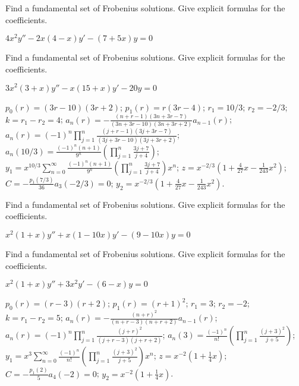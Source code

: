 \documentclass{ximera}
\begin{document}
\begin{problem}\label{exer:7.7.15}
Find
a fundamental set  of Frobenius solutions. Give explicit formulas for
the coefficients.

$4x^2y''-2x(4-x)y'-(7+5x)y=0$
\end{problem}

\begin{problem}\label{exer:7.7.16}
Find
a fundamental set  of Frobenius solutions. Give explicit formulas for
the coefficients.

$3x^2(3+x)y''-x(15+x)y'-20y=0$
\begin{solution}
    $p_0(r)=(3r-10)(3r+2)$;
$p_1(r)=r(3r-4)$;
$r_1=10/3$; $r_2=-2/3$; $k=r_1-r_2=4$;
$a_n(r)=-\frac{(n+r-1)(3n+3r-7)}{(3n+3r-10)(3n+3r+2)}
a_{n-1}(r)$;
$a_n(r)=(-1)^n\prod_{j=1}^n\frac{(j+r-1)(3j+3r-7)}{(3j+3r-10)(3j+3r+2)}$;
$a_n(10/3)=\frac{(-1)^n(n+1)}{9^n}\left(\prod_{j=1}^n\frac{3j+7}{
j+4}\right)$;
$y_1=x^{10/3}\sum_{n=0}^\infty\frac{(-1)^n(n+1)}{9^n}
\left(\prod_{j=1}^n\frac{3j+7}{ j+4}\right)x^n$;
$z=x^{-2/3}\left(1+\frac{4}{27}x-\frac{1}{243}x^2\right)$;
$C=-\frac{p_1(7/3)}{36}a_3(-2/3)=0$;
$y_2=x^{-2/3}\left(1+\frac{4}{27}x-\frac{1}{243}x^2\right)$.
\end{solution}
\end{problem}

\begin{problem}\label{exer:7.7.17}
Find
a fundamental set  of Frobenius solutions. Give explicit formulas for
the coefficients.

$x^2(1+x)y''+x(1-10x)y'-(9-10x)y=0$
\end{problem}

\begin{problem}\label{exer:7.7.18}
Find
a fundamental set  of Frobenius solutions. Give explicit formulas for
the coefficients.

$x^2(1+x)y''+3x^2y'-(6-x)y=0$
\begin{solution}
    $p_0(r)=(r-3)(r+2)$;
$p_1(r)=(r+1)^2$;
$r_1=3$; $r_2=-2$; $k=r_1-r_2=5$;
$a_n(r)=-\frac{(n+r)^2}{(n+r-3)(n+r+2)} a_{n-1}(r)$;
 $a_n(r)=(-1)^n\prod_{j=1}^n\frac{(j+r)^2}{(j+r-3)(j+r+2)}$;
$a_n(3)= \frac{(-1)^n}{ n!}\left(\prod_{j=1}^n\frac{(j+3)^2}{
j+5}\right)$;
$y_1=x^3\sum_{n=0}^\infty\frac{(-1)^n}{
n!}\left(\prod_{j=1}^n\frac{(j+3)^2}{
j+5}\right)x^n$;
$z=x^{-2}\left(1+\frac{1}{4}x\right)$;
$C=-\frac{p_1(2)}{5}a_4(-2)=0$;
$y_2=x^{-2}\left(1+\frac{1}{4}x\right)$.
\end{solution}
\end{problem}
\end{document}
